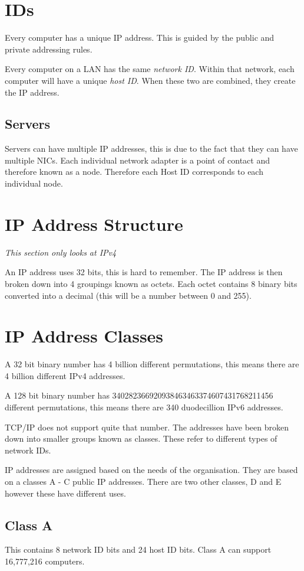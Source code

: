\section*{IDs}
Every computer has a unique IP address. This is guided by the public and private addressing rules.

Every computer on a LAN has the same \textit{network ID}. Within that network, each computer will have a unique \textit{host ID}. When these two are combined, they create the IP address.

\subsection*{Servers}
Servers can have multiple IP addresses, this is due to the fact that they can have multiple NICs. Each individual network adapter is a point of contact and therefore known as a node. Therefore each Host ID corresponds to each individual node. 

\section*{IP Address Structure}
\textit{This section only looks at IPv4}

An IP address uses 32 bits, this is hard to remember. The IP address is then broken down into 4 groupings known as octets. Each octet contains 8 binary bits converted into a decimal (this will be a number between 0 and 255).

\section*{IP Address Classes}
A 32 bit binary number has 4 billion different permutations, this means there are 4 billion different IPv4 addresses.

A 128 bit binary number has 340282366920938463463374607431768211456 different permutations, this means there are 340 duodecillion IPv6 addresses.

TCP/IP does not support quite that number. The addresses have been broken down into smaller groups known as classes. These refer to different types of network IDs.

IP addresses are assigned based on the needs of the organisation. They are based on a classes A - C public IP addresses. There are two other classes, D and E however these have different uses.

\subsection*{Class A}
This contains 8 network ID bits and 24 host ID bits. Class A can support 16,777,216 computers.

